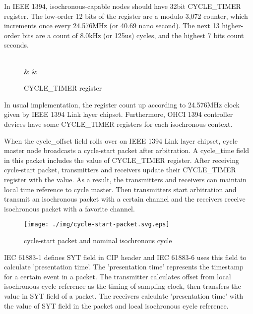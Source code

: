 \documentclass[onecolumn]{article}
\begin{document}
In IEEE 1394\cite{ieee1394-2}, isochronous-capable nodes should have 32bit CYCLE\_TIMER register. The low-order 12 bits of the register are a modulo 3,072 counter, which increments once every 24.576MHz (or 40.69 nano second). The next 13 higher-order bits are a count of 8.0kHz (or 125us) cycles, and the highest 7 bits count seconds.

\begin{figure}[htbp]
\centering
\begin{bytefield}[bitwidth=auto,endianness=big]{32}
	 \\
	 &
	 &
\end{bytefield}
\caption{{CYCLE\_TIMER register}}
\label{cycle_timer}
\end{figure}

In usual implementation, the register count up according to 24.576MHz clock given by IEEE 1394 Link layer chipset. Furthermore, OHCI 1394 controller devices have some CYCLE\_TIMER registers for each isochronous context.

When the cycle\_offset field rolls over on IEEE 1394 Link layer chipset, cycle master node broadcasts a cycle-start packet after arbitration. A cycle\_time field in this packet includes the value of CYCLE\_TIMER register. After receiving cycle-start packet, transmitters and receivers update their CYCLE\_TIMER register with the value. As a result, the transmitters and receivers can maintain local time reference to cycle master. Then transmitters start arbitration and transmit an isochronous packet with a certain channel and the receivers receive isochronous packet with a favorite channel.

\begin{figure}[htbp]
\centering
\texttt{[image: ./img/cycle-start-packet.svg.eps]}
\caption{{cycle-start packet and nominal isochronous cycle}}
\label{cycle-start}
\end{figure}

IEC 61883-1 defines SYT field in CIP header and IEC 61883-6 uses this field to calculate 'presentation time'. The 'presentation time' represents the timestamp for a certain event in a packet. The transmitter calculates offset from local isochronous cycle reference as the timing of sampling clock, then transfers the value in SYT field of a packet. The receivers calculate 'presentation time' with the value of SYT field in the packet and local isochronous cycle reference.
\end{document}

